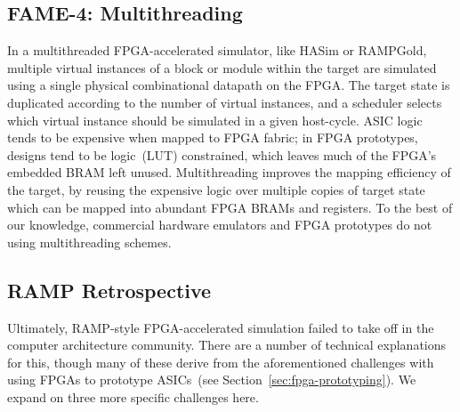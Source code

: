 \subsection{FAME-4: Multithreading}

In a multithreaded FPGA-accelerated simulator, like HASim or RAMPGold, multiple virtual instances of a
block or module within the target are simulated using a single physical
combinational datapath on the FPGA. The target state is duplicated according to the number of
virtual instances, and a scheduler selects which virtual instance should be
simulated in a given host-cycle. ASIC logic tends to be expensive when mapped
to FPGA fabric; in FPGA prototypes, designs tend to be logic~(LUT) constrained,
which leaves much of the FPGA's embedded BRAM left unused.  Multithreading
improves the mapping efficiency of the target, by reusing the expensive logic
over multiple copies of target state which can be mapped into abundant FPGA BRAMs and registers.
To the best of our knowledge, commercial hardware
emulators and FPGA prototypes do not using multithreading schemes.

\subsection{RAMP Retrospective}

Ultimately, RAMP-style FPGA-accelerated simulation failed to take off
in the computer architecture community. There are a number of technical explanations for this, though many of these
derive from the aforementioned challenges with using FPGAs to prototype ASICs~(see Section~\ref{sec:fpga-prototyping}).
We expand on three more specific challenges here.

